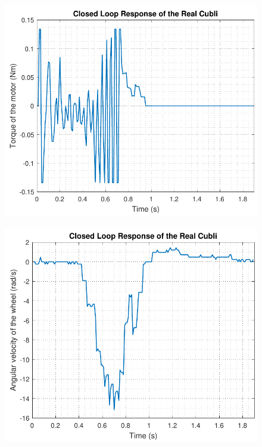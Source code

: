\\
\begin{minipage}{0.45\linewidth}
	\begin{figure}[H]
		\includegraphics[scale=.53]{figures/torqueTestTustinPre}
		\captionsetup{justification=centering}
		\label{torqueTestTustinPre}
	\end{figure}\vspace{-5mm}
\end{minipage}
\hspace{0.03\linewidth}
\begin{minipage}{0.45\linewidth}
	\begin{figure}[H]\vspace{-4mm}
		\includegraphics[scale=.53]{figures/wheelTestTustinPre}
		\captionsetup{justification=centering}
		\label{wheelTestTustinPre}
	\end{figure}\vspace{-5mm}
\end{minipage}
